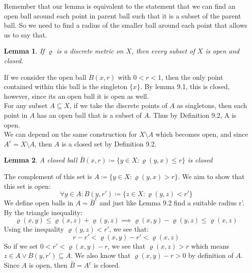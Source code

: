 \documentclass{article}
\newtheorem{lem}{Lemma}[section]
\begin{document}
Remember that our lemma is equivalent to the statement that we can find an open ball around each point in parent ball such that it is a subset of the parent ball. So we need to find a radius of the smaller ball around each point that allows us to say that.
\begin{lem}
If $\varrho$ is a discrete metric on $X$, then every subset of $X$ is open and closed.
\end{lem}
If we consider the open ball $B(x, r)$ with $0 < r < 1$, then the only point contained within this ball is the singleton $\{x\}$. By lemma 9.1, this is closed, however, since its an open ball it is open as well.\\

For any subset $A \subseteq X$, if we take the discrete points of $A$ as singletons, then each point in $A$ has an open ball that is a subset of $A$. Thus by Definition 9.2, A is open.\\

We can depend on the same construction for $X \setminus A$ which becomes open, and since $A^c = X \setminus A$, then $A$ is a closed set by Definition 9.2.\\

\begin{lem}
A closed ball $\bar{B}(x, r) \coloneq \{y \in X: \varrho(y, x) \leqslant r\}$ is closed
\end{lem}
The complement of this set is $A \coloneq \{y \in X: \varrho(y, x) > r\}$. We aim to show that this set is open:\\
\begin{equation*}
    \forall y \in A: B(y, r') \coloneq \{z \in X: \varrho(y, z) < r'\}
\end{equation*}
We define open balls in $A = \bar{B}^c$ and just like Lemma 9.2 find a suitable radius r'. By the triangle inequality:
\begin{equation*}
    \varrho(x, y) \leqslant \varrho(x, z) + \varrho(y, z) \implies \varrho(x, y) - \varrho(y, z) \leqslant \varrho(x, z)
\end{equation*}
Using the inequality $\varrho(y, z) < r'$, we see that:
\begin{equation*}
    r - r' < \varrho(x, y) - r' < \varrho(x, z)
\end{equation*}
So if we set $0 < r' < \varrho(x, y) - r$, we see that $\varrho(x, z) > r$ which means $z \in A \lor B(y, r') \subseteq A$. We also know that $\varrho(x, y) - r > 0$ by definition of $A$. Since $A$ is open, then $\bar{B} = A^c$ is closed.
\end{document}
